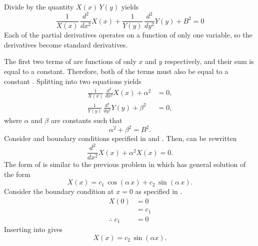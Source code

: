   Divide by the quantity $X(x)\,Y(y)$ yields
  \begin{equation}
    \label{eq:2d1g_divide_sum}
    \frac{1}{X(x)} \, \frac{d^2}{d x^2} X(x) + 
      \frac{1}{Y(y)} \, \frac{d^2}{d y^2} Y(y) + 
      B^2 = 0
  \end{equation}
  Each of the partial derivatives operates on a function of only one variable,
  so the derivatives become standard derivatives.

  The first two terms of  are functions of only $x$ and
  $y$ respectively, and their sum is equal to a constant. Therefore, both of the
  terms must also be equal to a constant \cite{lamarsh1966}. Splitting
   into two equations yields
  \begin{align}
    \label{eq:2d1g_x}
    \frac{1}{X(x)} \, \frac{d^2}{d x^2} X(x) + \alpha^2 &= 0, \\
    \label{eq:2d1g_y}
    \frac{1}{Y(y)} \, \frac{d^2}{d y^2} Y(y) + \beta^2 &= 0,
  \end{align}
  where $\alpha$ and $\beta$ are constants such that
  \begin{equation}
    \label{eq:2d1g_buckle_alphabeta}
    \alpha^2 + \beta^2 = B^2.
  \end{equation}
  Consider  and boundary conditions specified in
   and . Then,  can be
  rewritten
  \begin{equation}
    \label{eq:2d1g_xeqn}
    \frac{d^2}{dx^2} X(x) + \alpha^2 X(x) = 0.
  \end{equation}
  The form of  is similar to the previous problem in 
   which has general solution of the form
  \begin{equation}
    \label{eq:2d1g_x_general}
    X(x) = c_1 \, \cos(\alpha \, x) + c_2 \, \sin(\alpha \, x).
  \end{equation}
  Consider the boundary condition at $x=0$ as specified in .
  \begin{align}
    X(0) &= 0 \\
    &= c_1 \\
    \label{eq:2d1g_x_c1}
    \therefore \; c_1 &= 0
  \end{align}
  Inserting  into  gives
  \begin{equation}
    \label{eq:2d1g_x_sin}
    X(x) = c_2 \, \sin( \alpha x).
  \end{equation}
